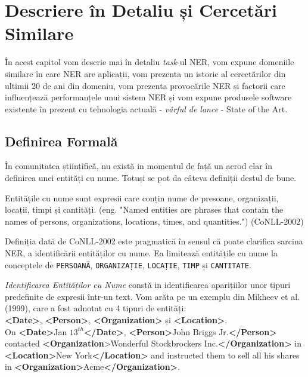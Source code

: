 \chapter{Descriere în Detaliu și Cercetări Similare}
\label{chapter:history}

În acest capitol vom descrie mai în detaliu \textit{task}-ul NER, vom expune domeniile similare în care NER are aplicații, vom prezenta un istoric al cercetărilor din ultimii 20 de ani din domeniu, vom prezenta provocările NER și factorii care influențează performanțele unui sistem NER și vom expune produsele software existente în prezent cu tehnologia actuală - \textit{vârful de lance} - State of the Art.

\section{Definirea Formală}

În comunitatea științifică, nu există in momentul de față un acrod clar în definirea unei entități cu nume. Totuși se pot da câteva definiții destul de bune.

Entitățile cu nume sunt expresii care conțin nume de presoane, organizații, locații, timpi și cantități. (eng. "Named entities are phrases that contain the names of persons, organizations, locations, times, and quantities.") (CoNLL-2002)

Definiția dată de CoNLL-2002 este pragmatică în sensul că poate clarifica sarcina NER, a identificării entităților cu nume. Ea limitează entitățile cu nume la conceptele de \texttt{PERSOANĂ}, \texttt{ORGANIZAȚIE}, \texttt{LOCAȚIE}, \texttt{TIMP} și \texttt{CANTITATE}.


\textit{Identificarea Entităților cu Nume} constă in identificarea aparițiilor unor tipuri predefinite de expresii într-un text. Vom arăta pe un exemplu din Mikheev et al. (1999)\cite{mikheev1999}, care a fost adnotat cu 4 tipuri de entități:\\

\textbf{<Date>}, \textbf{<Person>}, \textbf{<Organization>} și \textbf{<Location>}.\\


On \textbf{<Date>}Jan $13^{th}$\textbf{</Date>}, \textbf{<Person>}John Briggs Jr.\textbf{</Person>} contacted
\textbf{<Organization}>Wonderful Stockbrockers Inc.\textbf{</Organization>} in\textbf{ <Location>}New
York\textbf{</Location>} and instructed them to sell all his shares in
\textbf{<Organization>}Acme\textbf{</Organization>}.\\

